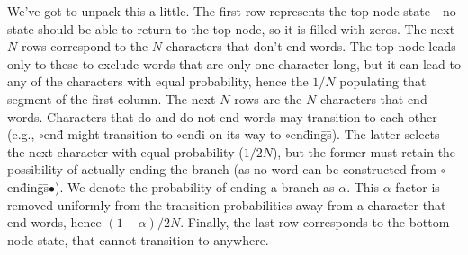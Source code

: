 \documentclass[11pt]{article}
\begin{document}
We've got to unpack this a little. The first row represents the top node state - no state should be able to return to the top node, so it is filled with zeros. The next $N$ rows correspond to the $N$ characters that don't end words. The top node leads only to these to exclude words that are only one character long, but it can lead to any of the characters with equal probability, hence the $1/N$ populating that segment of the first column. The next $N$ rows are the $N$ characters that end words. Characters that do and do not end words may transition to each other (e.g., $\circ$en\=d might transition to $\circ$en\=di on its way to $\circ$en\=din\=g\=s). The latter selects the next character with equal probability ($1/2N$), but the former must retain the possibility of actually ending the branch (as no word can be constructed from $\circ$en\=din\=g\=s$\bullet$). We denote the probability of ending a branch as $\alpha$. This $\alpha$ factor is removed uniformly from the transition probabilities away from a character that end words, hence $(1-\alpha)/2N$. Finally, the last row corresponds to the bottom node state, that cannot transition to anywhere.
\end{document}
